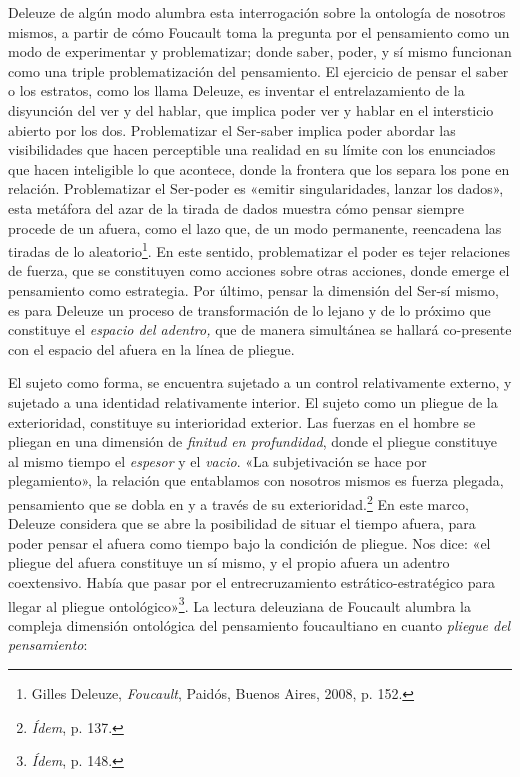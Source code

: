 Deleuze de algún modo alumbra esta interrogación sobre la ontología de nosotros mismos, a partir de cómo Foucault toma la pregunta por el pensamiento como un modo de experimentar y problematizar; donde saber, poder, y sí mismo funcionan como una triple problematización del pensamiento. El ejercicio de pensar el saber o los estratos, como los llama Deleuze, es inventar el entrelazamiento de la disyunción del ver y del hablar, que implica poder ver y hablar en el intersticio abierto por los dos. Problematizar el Ser-saber implica poder abordar las visibilidades que hacen perceptible una realidad en su límite con los enunciados que hacen inteligible lo que acontece, donde la frontera que los separa los pone en relación. Problematizar el Ser-poder es «emitir singularidades, lanzar los dados», esta metáfora del azar de la tirada de dados muestra cómo pensar siempre procede de un afuera, como el lazo que, de un modo permanente, reencadena las tiradas de lo aleatorio\footnote{Gilles Deleuze, \emph{Foucault}, Paidós, Buenos Aires, 2008, p. 152.}. En este sentido, problematizar el poder es tejer relaciones de fuerza, que se constituyen como acciones sobre otras acciones, donde emerge el pensamiento como estrategia. Por último, pensar la dimensión del Ser-sí mismo, es para Deleuze un proceso de transformación de lo lejano y de lo próximo que constituye el \emph{espacio del adentro,} que de manera simultánea se hallará co-presente con el espacio del afuera en la línea de pliegue.

El sujeto como forma, se encuentra sujetado a un control relativamente externo, y sujetado a una identidad relativamente interior. El sujeto como un pliegue de la exterioridad, constituye su interioridad exterior. Las fuerzas en el hombre se pliegan en una dimensión de \emph{finitud en profundidad}, donde el pliegue constituye al mismo tiempo el \emph{espesor} y el \emph{vacio}. «La subjetivación se hace por plegamiento», la relación que entablamos con nosotros mismos es fuerza plegada, pensamiento que se dobla en y a través de su exterioridad.\footnote{\emph{Ídem}, p. 137.} En este marco, Deleuze considera que se abre la posibilidad de situar el tiempo afuera, para poder pensar el afuera como tiempo bajo la condición de pliegue. Nos dice: «el pliegue del afuera constituye un sí mismo, y el propio afuera un adentro coextensivo. Había que pasar por el entrecruzamiento estrático-estratégico para llegar al pliegue ontológico»\footnote{\emph{Ídem}, p. 148.}. La lectura deleuziana de Foucault alumbra la compleja dimensión ontológica del pensamiento foucaultiano en cuanto \emph{pliegue del pensamiento}:

